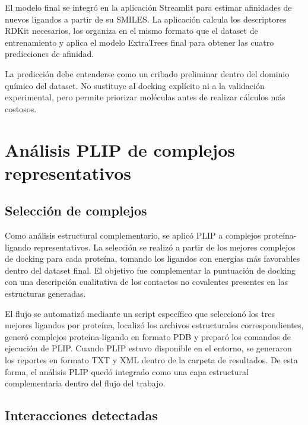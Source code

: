\documentclass[
  spanish,
  a4paper,
  12pt,
  oneside,
  openany]{memoir}
\newcommand{\apendice}[1]{\chapter{#1}}
\begin{document}
El modelo final se integró en la aplicación Streamlit para estimar
afinidades de nuevos ligandos a partir de su SMILES. La aplicación
calcula los descriptores RDKit necesarios, los organiza en el mismo
formato que el dataset de entrenamiento y aplica el modelo ExtraTrees
final para obtener las cuatro predicciones de afinidad.

La predicción debe entenderse como un cribado preliminar dentro del
dominio químico del dataset. No sustituye al docking explícito ni a la
validación experimental, pero permite priorizar moléculas antes de
realizar cálculos más costosos.

\apendice{Análisis PLIP de complejos representativos}

\section{Selección de complejos}

Como análisis estructural complementario, se aplicó PLIP a complejos
proteína-ligando representativos. La selección se realizó a partir de
los mejores complejos de docking para cada proteína, tomando los
ligandos con energías más favorables dentro del dataset final. El
objetivo fue complementar la puntuación de docking con una descripción
cualitativa de los contactos no covalentes presentes en las estructuras
generadas.

El flujo se automatizó mediante un script específico que seleccionó los
tres mejores ligandos por proteína, localizó los archivos estructurales
correspondientes, generó complejos proteína-ligando en formato PDB y
preparó los comandos de ejecución de PLIP. Cuando PLIP estuvo disponible
en el entorno, se generaron los reportes en formato TXT y XML dentro de
la carpeta de resultados. De esta forma, el análisis PLIP quedó
integrado como una capa estructural complementaria dentro del flujo del
trabajo.

\section{Interacciones detectadas}
\end{document}
